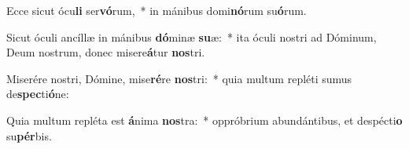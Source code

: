 \item Ecce sicut ócu\textbf{li} ser\textbf{vó}rum,~* in mánibus domi\textbf{nó}rum su\textbf{ó}rum.
\item Sicut óculi ancíllæ in mánibus \textbf{dó}minæ \textbf{su}æ:~* ita óculi nostri ad Dóminum, Deum nostrum, donec misere\textbf{á}tur \textbf{nos}tri.
\item Miserére nostri, Dómine, mise\textbf{ré}re \textbf{nos}tri:~* quia multum repléti sumus de\textbf{spec}ti\textbf{ó}ne:
\item Quia multum repléta est \textbf{á}nima \textbf{nos}tra:~* oppróbrium abundántibus, et despécti\textbf{o} su\textbf{pér}bis.
